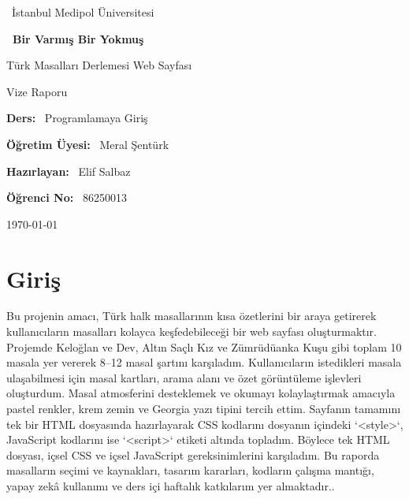 \documentclass[12pt,a4paper]{article}
\begin{document}
\begin{titlepage}
\centering
\vspace*{1cm}
{\large \ İstanbul Medipol Üniversitesi \par}
\vspace{1.8cm}
{\Huge\bfseries\color{ana} \ Bir Varmış Bir Yokmuş \par}
\vspace{0.4cm}
{\Large Türk Masalları Derlemesi Web Sayfası \par}
{\large Vize Raporu \par}
\vspace{1.8cm}
{\large \textbf{Ders:} \ Programlamaya Giriş \par}
{\large \textbf{Öğretim Üyesi:} \ Meral Şentürk \par}
\vspace{1.2cm}
{\large \textbf{Hazırlayan:} \ Elif Salbaz \par}
{\large \textbf{Öğrenci No:} \ 86250013 \par}
\vspace{1.8cm}
\vfill
{\large \today \par}
\end{titlepage}

\tableofcontents
\newpage

\section{Giriş}
 Bu  projenin amacı, Türk halk masallarının kısa özetlerini bir araya getirerek kullanıcıların masalları kolayca keşfedebileceği bir web sayfası oluşturmaktır. Projemde Keloğlan ve Dev, Altın Saçlı Kız ve Zümrüdüanka Kuşu gibi toplam 10 masala yer vererek 8–12 masal şartını karşıladım. Kullanıcıların istedikleri masala ulaşabilmesi için masal kartları, arama alanı ve özet görüntüleme işlevleri oluşturdum. Masal atmosferini desteklemek ve okumayı kolaylaştırmak amacıyla pastel renkler, krem zemin ve Georgia yazı tipini tercih ettim. Sayfanın tamamını tek bir HTML dosyasında hazırlayarak CSS kodlarını dosyanın içindeki `<style>`, JavaScript kodlarını ise `<script>` etiketi altında topladım. Böylece tek HTML dosyası, içsel CSS ve içsel JavaScript gereksinimlerini karşıladım. Bu raporda masalların seçimi ve kaynakları, tasarım kararları, kodların çalışma mantığı, yapay zekâ kullanımı ve ders içi haftalık katkılarım yer almaktadır..
\end{document}
